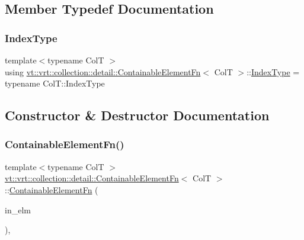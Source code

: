 \subsection{Member Typedef Documentation}
\mbox{\label{structvt_1_1vrt_1_1collection_1_1detail_1_1_containable_element_fn_a8b72c632bf735826e02f41f6d89df5d9}} 
\subsubsection{\texorpdfstring{Index\+Type}{IndexType}}
{\footnotesize\ttfamily template$<$typename ColT $>$ \\
using \hyperlink{structvt_1_1vrt_1_1collection_1_1detail_1_1_containable_element_fn}{vt\+::vrt\+::collection\+::detail\+::\+Containable\+Element\+Fn}$<$ ColT $>$\+::\hyperlink{structvt_1_1vrt_1_1collection_1_1detail_1_1_containable_element_fn_a8b72c632bf735826e02f41f6d89df5d9}{Index\+Type} =  typename Col\+T\+::\+Index\+Type}



\subsection{Constructor \& Destructor Documentation}
\mbox{\label{structvt_1_1vrt_1_1collection_1_1detail_1_1_containable_element_fn_a1a510ac14f89966aef44e5d701eb0957}} 
\subsubsection{\texorpdfstring{Containable\+Element\+Fn()}{ContainableElementFn()}}
{\footnotesize\ttfamily template$<$typename ColT $>$ \\
\hyperlink{structvt_1_1vrt_1_1collection_1_1detail_1_1_containable_element_fn}{vt\+::vrt\+::collection\+::detail\+::\+Containable\+Element\+Fn}$<$ ColT $>$\+::\hyperlink{structvt_1_1vrt_1_1collection_1_1detail_1_1_containable_element_fn}{Containable\+Element\+Fn} (\begin{DoxyParamCaption}\item[{std\+::unique\+\_\+ptr$<$ ColT $>$}]{in\+\_\+elm }\end{DoxyParamCaption})\hspace{0.3cm}{\ttfamily [inline]}, {\ttfamily [explicit]}}



